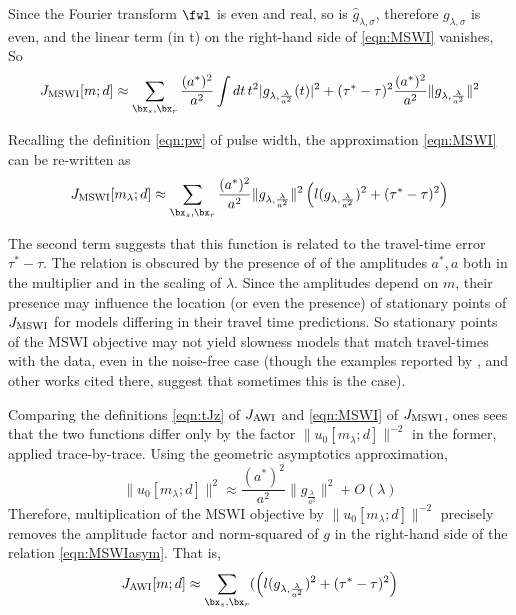 Since the Fourier transform $\fwl$ is even and real, so is
$\hat{g}_{\lambda,\sigma}$, therefore $g_{\lambda,\sigma}$ is even, and the linear term (in t) on the
right-hand side of \ref{eqn:MSWI} vanishes, So
\begin{equation}
  \label{eqn:MSWIasym}
  J_{\rm MSWI}[m;d] \approx
\sum_{\bx_s,\bx_r}\frac{(a^*)^2}{a^2} \int dt\, t^2|g_{\lambda,\frac{\lambda}{a^2}}(t)|^2
+(\tau^*-\tau)^2\frac{(a^*)^2}{a^2}\|g_{\lambda,\frac{\lambda}{a^2}}\|^2
\end{equation}

Recalling the definition \ref{eqn:pw} of pulse width, the
approximation \ref{eqn:MSWI} can be re-written as
\begin{equation}
  J_{\rm MSWI}[m_{\lambda};d] \approx
  \sum_{\bx_s,\bx_r}\frac{(a^*)^2}{a^2}\|g_{\lambda,\frac{\lambda}{a^2}}\|^2\left(l(g_{\lambda,\frac{\lambda}{a^2}})^2  + (\tau^*-\tau)^2\right)
\end{equation}

The second term suggests that this function
is related to the travel-time error $\tau^*-\tau$.
The relation is obscured by the presence of of the amplitudes
$a^*, a$ both in the multiplier and in the scaling of $\lambda$. Since the
amplitudes depend on $m$, their presence may influence the location
(or even the presence) of stationary points of $J_{\rm MSWI}$ for
models differing in their travel time predictions. So stationary
points of the MSWI objective may not yield slowness models that match
travel-times with the data, even in the noise-free case (though
the examples reported by \cite{HuangSymes2015SEG, HuangSymes:Geo17}, and other works
cited there, suggest that sometimes this is the case).

Comparing the definitions \ref{eqn:tJz} of $J_{\rm AWI}$ and
\ref{eqn:MSWI} of $J_{\rm MSWI}$, ones sees
that the two functions differ only by the factor $\|u_0[m_{\lambda};d]\|^{-2}$ in
the former, applied trace-by-trace. Using the geometric asymptotics approximation, 
$$
\|u_0[m_{\lambda};d]\|^2 \approx \frac{(a^*)^2}{a^2}\|g_{\frac{\lambda}{a^2}}\|^2 + O(\lambda)
$$
Therefore, multiplication of the MSWI objective by $\|u_0[m_{\lambda};d]\|^{-2}$
precisely removes the amplitude factor and norm-squared of $g$ in the right-hand side of the
relation \ref{eqn:MSWIasym}. That is,
\begin{equation}
  \label{eqn:preawitt}
J_{\rm AWI}[m;d] \approx \sum_{\bx_s,\bx_r} (\left(l(g_{\lambda,\frac{\lambda}{a^2}})^2  + (\tau^*-\tau)^2\right)
 \end{equation}



